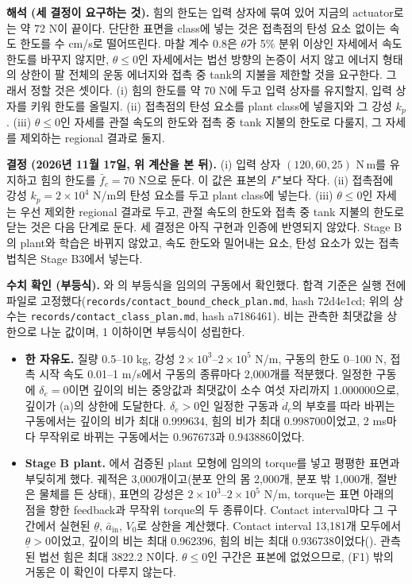 \documentclass[11pt]{article}\usepackage[margin=1in]{geometry}\usepackage{amsmath,amssymb,amsthm,mathtools}\usepackage{graphicx}\graphicspath{{figures/}{../figures/}{figs/}{./}}\usepackage{enumitem}\usepackage{hyperref}\usepackage{cleveref}\usepackage{tikz}\usetikzlibrary{arrows.meta,positioning,calc,shapes.geometric}\usepackage{float}\usepackage{rotating}\usepackage[most]{tcolorbox}\usepackage{kotex}\usepackage{booktabs}\usepackage{longtable}\emergencystretch=1.6em\tolerance=2000 \crefname{assumption}{Assumption}{Assumptions}\Crefname{assumption}{Assumption}{Assumptions}\crefname{definition}{Definition}{Definitions}\Crefname{definition}{Definition}{Definitions}\crefname{proposition}{Proposition}{Propositions}\Crefname{proposition}{Proposition}{Propositions}\crefname{fact}{Fact}{Facts}\Crefname{fact}{Fact}{Facts} \newtheorem{assumption}{Assumption}\newtheorem{definition}{Definition}\newtheorem{lemma}{Lemma}\newtheorem{proposition}{Proposition}\newtheorem{theorem}{Theorem}\newtheorem{corollary}{Corollary}\newtheorem{fact}{Fact}\theoremstyle{remark}\newtheorem{remark}{Remark} \newcommand{\R}{\mathbb{R}}\newcommand{\xb}{\bar x}\newcommand{\Ab}{\bar A}\newcommand{\By}{\bar B_y}\newcommand{\U}{\mathcal U}\newcommand{\Z}{\mathcal Z}
\begin{document}
\textbf{해석 (세 결정이 요구하는 것).} 힘의 한도는 입력 상자에 묶여 있어 지금의 actuator로는 약 72 N이 끝이다. 단단한 표면을 class에 넣는 것은 접촉점의 탄성 요소 없이는 속도 한도를 수 cm/s로 떨어뜨린다. 마찰 계수 0.8은 $\theta$가 5\% 분위 이상인 자세에서 속도 한도를 바꾸지 않지만, $\theta\le0$인 자세에서는 법선 방향의 논증이 서지 않고 에너지 형태의 상한이 팔 전체의 운동 에너지와 접촉 중 tank의 지불을 제한할 것을 요구한다. 그래서 정할 것은 셋이다. (i) 힘의 한도를 약 70 N에 두고 입력 상자를 유지할지, 입력 상자를 키워 한도를 올릴지. (ii) 접촉점의 탄성 요소를 plant class에 넣을지와 그 강성 $k_p$. (iii) $\theta\le0$인 자세를 관절 속도의 한도와 접촉 중 tank 지불의 한도로 다룰지, 그 자세를 제외하는 regional 결과로 둘지.

\textbf{결정 (2026년 11월 17일, 위 계산을 본 뒤).} (i) 입력 상자 $(120,60,25)$ N\,m를 유지하고 힘의 한도를 $\bar f_c=70$ N으로 둔다. 이 값은 표본의 $F^\star$보다 작다. (ii) 접촉점에 강성 $k_p=2\times10^4$ N/m의 탄성 요소를 두고 plant class에 넣는다. (iii) $\theta\le0$인 자세는 우선 제외한 regional 결과로 두고, 관절 속도의 한도와 접촉 중 tank 지불의 한도로 닫는 것은 다음 단계로 둔다. 세 결정은 아직 구현과 인증에 반영되지 않았다. Stage B의 plant와 학습은 바뀌지 않았고, 속도 한도와 밀어내는 요소, 탄성 요소가 있는 접촉 법칙은 Stage B3에서 넣는다.

\textbf{수치 확인 (부등식).} 와 의 부등식을 임의의 구동에서 확인했다. 합격 기준은 실행 전에 파일로 고정했다(\texttt{records/contact\_bound\_check\_plan.md}, hash 72d4e1cd; 위의 상수는 \texttt{records/contact\_class\_plan.md}, hash a7186461). 비는 관측한 최댓값을 상한으로 나눈 값이며, 1 이하이면 부등식이 성립한다.
\begin{itemize}
\item \textbf{한 자유도.} 질량 0.5--10 kg, 강성 $2\times10^3$--$2\times10^5$ N/m, 구동의 한도 0--100 N, 접촉 시작 속도 0.01--1 m/s에서 구동의 종류마다 2{,}000개를 적분했다. 일정한 구동에 $\delta_e=0$이면 깊이의 비는 중앙값과 최댓값이 소수 여섯 자리까지 1.000000으로, 깊이가 (a)의 상한에 도달한다. $\delta_e>0$인 일정한 구동과 $\dot d_c$의 부호를 따라 바뀌는 구동에서는 깊이의 비가 최대 0.999634, 힘의 비가 최대 0.998700이었고, 2 ms마다 무작위로 바뀌는 구동에서는 0.967673과 0.943886이었다.
\item \textbf{Stage B plant.} 에서 검증된 plant 모형에 임의의 torque를 넣고 평평한 표면과 부딪히게 했다. 궤적은 3{,}000개이고(분포 안의 몸 2{,}000개, 분포 밖 1{,}000개, 절반은 물체를 든 상태), 표면의 강성은 $2\times10^3$--$2\times10^5$ N/m, torque는 표면 아래의 점을 향한 feedback과 무작위 torque의 두 종류이다. Contact interval마다 그 구간에서 실현된 $\underline\theta$, $\bar a_{\mathrm{in}}$, $V_0$로 상한을 계산했다. Contact interval 13{,}181개 모두에서 $\underline\theta>0$이었고, 깊이의 비는 최대 0.962396, 힘의 비는 최대 0.936738이었다(). 관측된 법선 힘은 최대 3822.2 N이다. $\theta\le0$인 구간은 표본에 없었으므로, (F1) 밖의 거동은 이 확인이 다루지 않는다.
\end{itemize}
\end{document}
